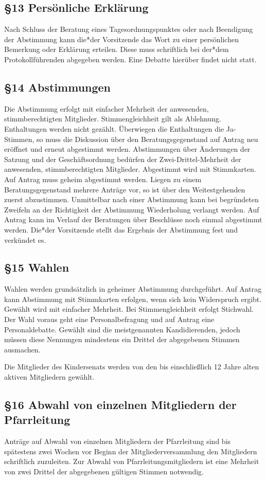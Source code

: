 \documentclass[12pt]{report}
\begin{document}
\begin{flushleft}
\subsection*{§13 Persönliche Erklärung}
Nach Schluss der Beratung eines Tagesordnungspunktes oder nach Beendigung der Abstimmung kann
die*der Vorsitzende das Wort zu einer persönlichen Bemerkung oder Erklärung erteilen. Diese muss
schriftlich bei der*dem Protokollführenden abgegeben werden. Eine Debatte hierüber findet nicht statt.
\subsection*{§14 Abstimmungen}
Die Abstimmung erfolgt mit einfacher Mehrheit der anwesenden, stimmberechtigten Mitglieder.
Stimmengleichheit gilt als Ablehnung. Enthaltungen werden nicht gezählt. Überwiegen die Enthaltungen
die Ja-Stimmen, so muss die Diskussion über den Beratungsgegenstand auf Antrag neu eröffnet und erneut
abgestimmt werden. Abstimmungen über Änderungen der Satzung und der Geschäftsordnung bedürfen der 
Zwei-Drittel-Mehrheit der anwesenden, stimmberechtigten Mitglieder. Abgestimmt wird mit Stimmkarten.
Auf Antrag muss geheim abgestimmt werden. Liegen zu einem Beratungsgegenstand mehrere Anträge vor, so ist
über den Weitestgehenden zuerst abzustimmen. Unmittelbar nach einer Abstimmung kann bei begründeten
Zweifeln an der Richtigkeit der Abstimmung Wiederholung verlangt werden. Auf Antrag kann im Verlauf der
Beratungen über Beschlüsse noch einmal abgestimmt werden. Die*der Vorsitzende stellt das Ergebnis der
Abstimmung fest und verkündet es.
\subsection*{§15 Wahlen}
Wahlen werden grundsätzlich in geheimer Abstimmung durchgeführt. Auf Antrag kann Abstimmung mit
Stimmkarten erfolgen, wenn sich kein Widerspruch ergibt. Gewählt wird mit einfacher Mehrheit. Bei
Stimmengleichheit erfolgt Stichwahl. Der Wahl voraus geht eine Personalbefragung und auf Antrag eine
Personaldebatte. Gewählt sind die meistgenannten Kandidierenden, jedoch müssen diese Nennungen mindestens
ein Drittel der abgegebenen Stimmen ausmachen.

Die Mitglieder des Kindersenats werden von den bis einschließlich 12 Jahre alten aktiven Mitgliedern gewählt.
\subsection*{§16 Abwahl von einzelnen Mitgliedern der Pfarrleitung}
Anträge auf Abwahl von einzelnen Mitgliedern der Pfarrleitung sind bis spätestens zwei Wochen vor Beginn
der Mitgliederversammlung den Mitgliedern schriftlich zuzuleiten. Zur Abwahl von Pfarrleitungsmitgliedern
ist eine Mehrheit von zwei Drittel der abgegebenen gültigen Stimmen notwendig.

\end{flushleft}
\end{document}
